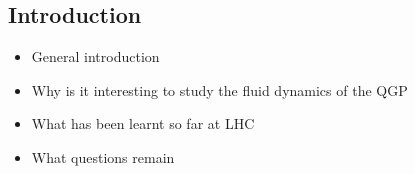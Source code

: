 \subsection{Introduction}
\begin{itemize}
	\item General introduction
	\item Why is it interesting to study the fluid dynamics of the QGP
	\item What has been learnt so far at LHC 
	\item What questions remain
\end{itemize}
